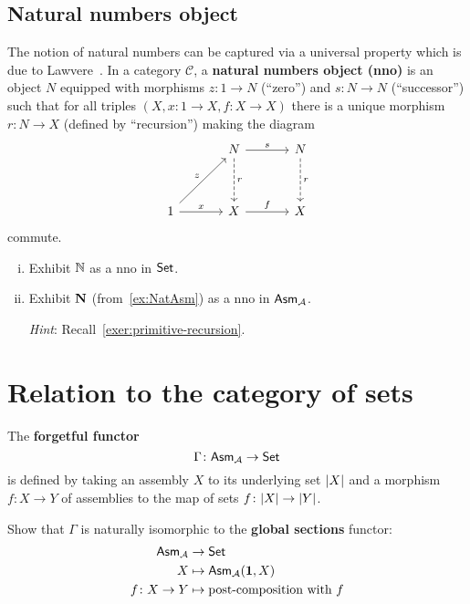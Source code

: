 \subsection{Natural numbers object}
The notion of natural numbers can be captured via a universal
property which is due to Lawvere~\cite{Lawvere1963}. In a category
\(\mathcal C\), a \textbf{natural numbers object (nno)} is an object \(N\) equipped
with morphisms \(z \colon 1 \to N\) (``zero'') and \(s \colon N \to N\)
(``successor'') such that for all triples
\((X,x \colon 1 \to X,f\colon X \to X)\) there is a unique morphism
\(r \colon N \to X\) (defined by ``recursion'') making the diagram
\[
  \begin{tikzcd}[row sep=12mm,column sep=12mm]
    & N \ar[r,"s"] \ar[d,dashed,"r"] & N \ar[d,dashed,"r"] \\
    1 \ar[ur,"z"] \ar[r,"x"] & X \ar[r,"f"] & X
  \end{tikzcd}
\]
commute.

\begin{exercise}\label{exer:nno} \leavevmode
  \begin{enumerate}[(i)]
  \item Exhibit \(\mathbb N\) as a nno in \(\mathsf{Set}\).
  \item Exhibit \(\mathbf N\) (from~\cref{ex:NatAsm}) as a nno in \(\mathsf{Asm}_{\mathcal A}\).

    \emph{Hint}: Recall~\cref{exer:primitive-recursion}.
  \end{enumerate}
\end{exercise}

\section{Relation to the category of sets}

\begin{definition}
  The \textbf{forgetful functor}
  \[
    \Gamma \colon \mathsf{Asm}_{\mathcal A} \to \mathsf{Set}
  \]
  is defined by taking an assembly \(X\) to its underlying set \(\lvert X\rvert\)
  and a morphism \(f \colon X \to Y\) of assemblies to the map of sets
  \(f \colon \lvert X\rvert \to \lvert Y\rvert\).
\end{definition}

\begin{exercise}\label{exer:Gamma-global-sections}
  Show that \(\Gamma\) is naturally isomorphic to the \textbf{global sections}
  functor:
  \begin{align*}
    \mathsf{Asm}_{\mathcal A} &\to \mathsf{Set} \\
    X &\mapsto \mathsf{Asm}_{\mathcal A}(\mathbf 1,X) \\
    f \colon X \to Y &\mapsto \text{post-composition with \(f\)}
  \end{align*}
\end{exercise}

